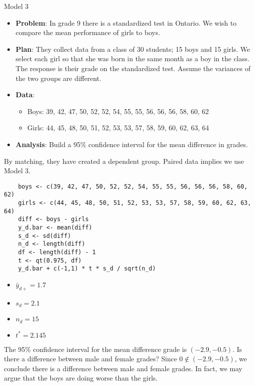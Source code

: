 \begin{Example}{Model 3}{}
    \begin{itemize}
        \item \textbf{Problem}: In grade 9 there is a standardized test in Ontario.
              We wish to compare the mean performance of girls to boys.
        \item \textbf{Plan}: They collect data from a class of 30 students; 15 boys and 15 girls. We select each girl so that she was born in the
              same month as a boy in the class. The response is their grade on the standardized test.
              Assume the variances of the two groups are different.
        \item \textbf{Data}:
              \begin{itemize}
                  \item Boys: 39, 42, 47, 50, 52, 52, 54, 55, 55, 56, 56, 56, 58, 60, 62
                  \item Girls: 44, 45, 48, 50, 51, 52, 53, 53, 57, 58, 59, 60, 62, 63, 64
              \end{itemize}
        \item \textbf{Analysis}: Build a 95\% confidence interval for the mean difference
              in grades.
    \end{itemize}
    By matching, they have created a dependent group. Paired data implies
    we use Model 3.
    \begin{verbatim}
    boys <- c(39, 42, 47, 50, 52, 52, 54, 55, 55, 56, 56, 56, 58, 60, 62)
    girls <- c(44, 45, 48, 50, 51, 52, 53, 53, 57, 58, 59, 60, 62, 63, 64)
    diff <- boys - girls
    y_d.bar <- mean(diff)
    s_d <- sd(diff)
    n_d <- length(diff)
    df <- length(diff) - 1 
    t <- qt(0.975, df)
    y_d.bar + c(-1,1) * t * s_d / sqrt(n_d)
    \end{verbatim}
    \begin{itemize}
        \item $ \bar{y}_{d+}=1.7 $
        \item $ s_d=2.1 $
        \item $ n_d=15 $
        \item $ t^*=2.145 $
    \end{itemize}
    The 95\% confidence interval for the mean difference grade is
    $ (-2.9,-0.5) $. Is there a difference between male and female grades?
    Since $ 0\notin (-2.9,-0.5) $, we conclude there is a difference between male
    and female grades. In fact, we may argue that the boys are doing worse than the girls.
\end{Example}
